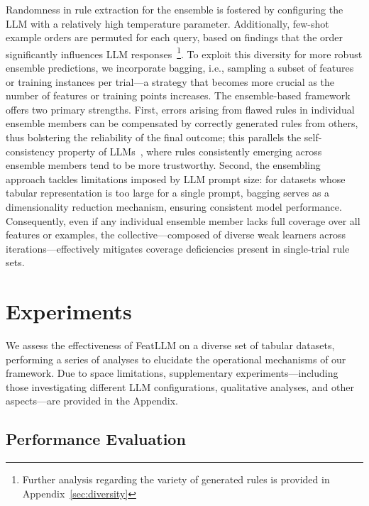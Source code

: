 Randomness in rule extraction for the ensemble is fostered by configuring the LLM with a relatively high temperature parameter. Additionally, few-shot example orders are permuted for each query, based on findings that the order significantly influences LLM responses~\cite{lu2022fantastically}\footnote{Further analysis regarding the variety of generated rules is provided in Appendix~\ref{sec:diversity}}. To exploit this diversity for more robust ensemble predictions, we incorporate bagging, i.e., sampling a subset of features or training instances per trial—a strategy that becomes more crucial as the number of features or training points increases. The ensemble-based framework offers two primary strengths. First, errors arising from flawed rules in individual ensemble members can be compensated by correctly generated rules from others, thus bolstering the reliability of the final outcome; this parallels the self-consistency property of LLMs~\cite{wang2022self}, where rules consistently emerging across ensemble members tend to be more trustworthy. Second, the ensembling approach tackles limitations imposed by LLM prompt size: for datasets whose tabular representation is too large for a single prompt, bagging serves as a dimensionality reduction mechanism, ensuring consistent model performance. Consequently, even if any individual ensemble member lacks full coverage over all features or examples, the collective—composed of diverse weak learners across iterations—effectively mitigates coverage deficiencies present in single-trial rule sets.

\section{Experiments}

We assess the effectiveness of \textsf{FeatLLM} on a diverse set of tabular datasets, performing a series of analyses to elucidate the operational mechanisms of our framework. Due to space limitations, supplementary experiments—including those investigating different LLM configurations, qualitative analyses, and other aspects—are provided in the Appendix.

\subsection{Performance Evaluation}

